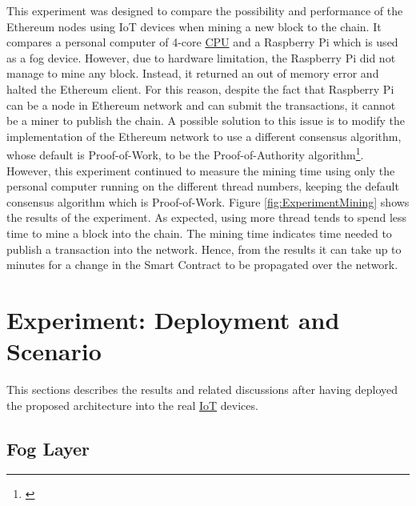 \npara This experiment was designed to compare the possibility and performance of the Ethereum nodes using IoT devices when mining a new block to the chain.
It compares a personal computer of 4-core \hyperref[Acronym-CPU]{CPU} and a Raspberry Pi which is used as a fog device.
However, due to hardware limitation, the Raspberry Pi did not manage to mine any block.
Instead, it returned an out of memory error and halted the Ethereum client.
For this reason, despite the fact that Raspberry Pi can be a node in Ethereum network and can submit the transactions, it cannot be a miner to publish the chain.
A possible solution to this issue is to modify the implementation of the Ethereum network to use a different consensus algorithm, whose default is Proof-of-Work, to be the Proof-of-Authority algorithm\footnote{\hyperlink{https://ethereum.stackexchange.com/questions/24955/geth-mining-on-32bits-host-raspberry-pi-memory-error}{}}.
However, this experiment continued to measure the mining time using only the personal computer running on the different thread numbers, keeping the default consensus algorithm which is Proof-of-Work.
Figure \ref{fig:ExperimentMining} shows the results of the experiment.
As expected, using more thread tends to spend less time to mine a block into the chain.
The mining time indicates time needed to publish a transaction into the network.
Hence, from the results it can take up to minutes for a change in the Smart Contract to be propagated over the network.
\newpage

\section{Experiment: Deployment and Scenario} \label{Results-Deployment}

\npara This sections describes the results and related discussions after having deployed the proposed architecture into the real \hyperref[Acronym-IoT]{IoT} devices.

\subsection*{Fog Layer}

